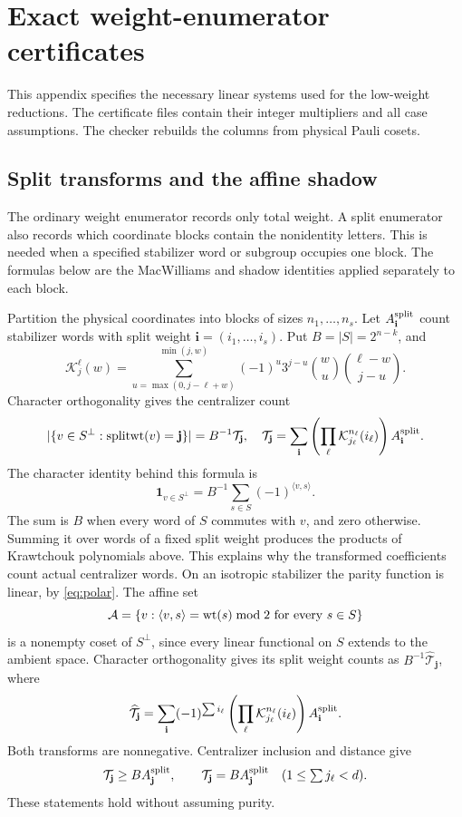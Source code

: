 \section{Exact weight-enumerator certificates}\label{app:certificates}

This appendix specifies the necessary linear systems used for the
low-weight reductions. The certificate files contain their integer
multipliers and all case assumptions. The checker rebuilds the columns
from physical Pauli cosets.

\subsection{Split transforms and the affine shadow}

The ordinary weight enumerator records only total weight. A split
enumerator also records which coordinate blocks contain the nonidentity
letters. This is needed when a specified stabilizer word or subgroup
occupies one block. The formulas below are the MacWilliams and shadow
identities applied separately to each block.

Partition the physical coordinates into blocks of sizes
\(n_1,\ldots,n_s\). Let \(A^{\rm split}_{\mathbf i}\) count stabilizer words with
split weight \(\mathbf i=(i_1,\ldots,i_s)\). Put \(B=|S|=2^{n-k}\), and
\[
 \mathcal{K}_j^{\ell}(w)=\sum_{u=\max(0,j-\ell+w)}^{\min(j,w)}
          (-1)^u3^{j-u}\binom wu\binom{\ell-w}{j-u}.
\]
Character orthogonality gives the centralizer count
\[
 |\{v\in S^\perp:\operatorname{splitwt}(v)=\mathbf j\}|
 =B^{-1}\mathcal T_{\mathbf j},\quad
 \mathcal T_{\mathbf j}=\sum_{\mathbf i}
       \left(\prod_\ell \mathcal{K}_{j_\ell}^{n_\ell}(i_\ell)\right)A^{\rm split}_{\mathbf i}.
\]
The character identity behind this formula is
\[
 \mathbf 1_{v\in S^\perp}=B^{-1}\sum_{s\in S}(-1)^{\langle v,s\rangle}.
\]
The sum is \(B\) when every word of \(S\) commutes with \(v\),
and zero otherwise. Summing it over words of a fixed split weight
produces the products of Krawtchouk polynomials above. This explains why
the transformed coefficients count actual centralizer words.
On an isotropic stabilizer the parity function is linear, by
\eqref{eq:polar}. The affine set
\[
 \mathcal A=\{v:\langle v,s\rangle=\operatorname{wt}(s)\bmod2
                          \text{ for every }s\in S\}
\]
is a nonempty coset of \(S^\perp\), since every linear functional on
\(S\) extends to the ambient space. Character orthogonality gives its
split weight counts as \(B^{-1}\widehat{\mathcal T}_{\mathbf j}\), where
\[
 \widehat{\mathcal T}_{\mathbf j}=\sum_{\mathbf i}(-1)^{\sum i_\ell}
       \left(\prod_\ell \mathcal{K}_{j_\ell}^{n_\ell}(i_\ell)\right)A^{\rm split}_{\mathbf i}.
\]
Both transforms are nonnegative. Centralizer inclusion and distance give
\[
 \mathcal T_{\mathbf j}\geq BA^{\rm split}_{\mathbf j},\qquad
 \mathcal T_{\mathbf j}=BA^{\rm split}_{\mathbf j}\quad(1\leq\textstyle\sum j_\ell<d).
\]
These statements hold without assuming purity.

